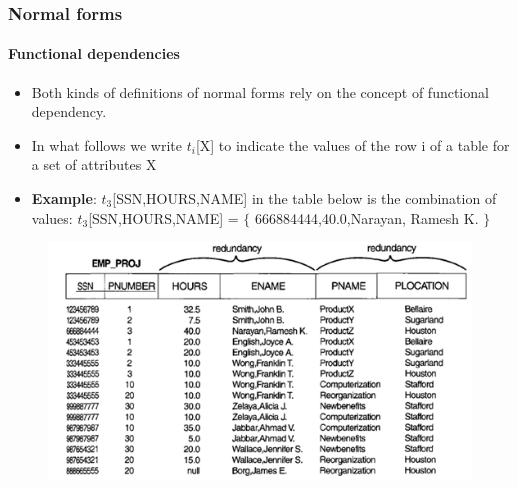 \documentclass{beamer}
\newcommand{\valseq}[1]{$\lbrace$ #1 $\rbrace$}
\newcommand{\tuple}[2]{$t_{#1}$[#2]}
\begin{document}
\begin{frame}
	\frametitle{Normal forms}
	\framesubtitle{Functional dependencies}
	\begin{itemize}
		\item Both kinds of definitions of normal forms rely on the concept of functional dependency.
		\item In what follows we write \tuple{i}{X} to indicate the values of the row i of a table for a set of attributes X
		\item \textbf{Example}: \tuple{3}{SSN,HOURS,NAME} in the table below is the combination of values: 
		\tuple{3}{SSN,HOURS,NAME} = \valseq{666884444,40.0,Narayan, Ramesh K.}
	\end{itemize}
	
	\begin{figure}
		\includegraphics[scale=0.4]{img/normalization/norm5}
	\end{figure}
\end{frame}
\end{document}
